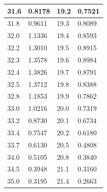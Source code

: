 \documentclass[12pt, a4paper]{article}
\begin{document}
\begin{minipage}{0.45\linewidth}
\begin{table}[H]
\begin{tabular}{|ll|ll|}
      \multicolumn{1}{|l|}{31.6}              & 0.8178            & \multicolumn{1}{l|}{19.2}              & 0.7521            \\ \hline
      \multicolumn{1}{|l|}{31.8}              & 0.9611            & \multicolumn{1}{l|}{19.3}              & 0.8089            \\ \hline
      \multicolumn{1}{|l|}{32.0}              & 1.1336            & \multicolumn{1}{l|}{19.4}              & 0.8593            \\ \hline
      \multicolumn{1}{|l|}{32.2}              & 1.3010            & \multicolumn{1}{l|}{19.5}              & 0.8915            \\ \hline
      \multicolumn{1}{|l|}{32.3}              & 1.3578            & \multicolumn{1}{l|}{19.6}              & 0.8984            \\ \hline
      \multicolumn{1}{|l|}{32.4}              & 1.3826            & \multicolumn{1}{l|}{19.7}              & 0.8791            \\ \hline
      \multicolumn{1}{|l|}{32.5}              & 1.3712            & \multicolumn{1}{l|}{19.8}              & 0.8388            \\ \hline
      \multicolumn{1}{|l|}{32.8}              & 1.1853            & \multicolumn{1}{l|}{19.9}              & 0.7862            \\ \hline
      \multicolumn{1}{|l|}{33.0}              & 1.0216            & \multicolumn{1}{l|}{20.0}              & 0.7319            \\ \hline
      \multicolumn{1}{|l|}{33.2}              & 0.8730            & \multicolumn{1}{l|}{20.1}              & 0.6734            \\ \hline
      \multicolumn{1}{|l|}{33.4}              & 0.7547            & \multicolumn{1}{l|}{20.2}              & 0.6180            \\ \hline
      \multicolumn{1}{|l|}{33.7}              & 0.6130            & \multicolumn{1}{l|}{20.5}              & 0.4808            \\ \hline
      \multicolumn{1}{|l|}{34.0}              & 0.5105            & \multicolumn{1}{l|}{20.8}              & 0.3840            \\ \hline
      \multicolumn{1}{|l|}{34.5}              & 0.3948            & \multicolumn{1}{l|}{21.1}              & 0.3160            \\ \hline
      \multicolumn{1}{|l|}{35.0}              & 0.3195            & \multicolumn{1}{l|}{21.4}              & 0.2663            \\ \hline

\end{tabular}
\end{table}
\end{minipage}
\end{document}
